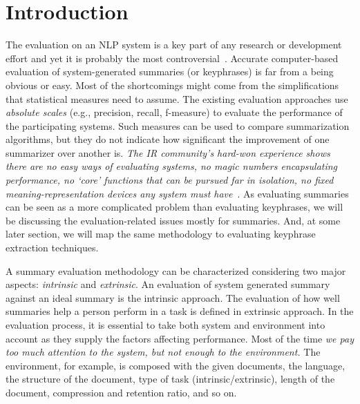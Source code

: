 \documentclass[a4paper]{report}
\begin{document}
\section{Introduction}
The evaluation on an NLP system is a key part of any research or development effort and yet it is probably the most controversial~\cite{Jing98summarizationevaluation}. Accurate computer-based evaluation of system-generated summaries (or keyphrases) is far from a being obvious or easy. Most of the shortcomings might come from the simplifications that statistical measures need to assume. The existing evaluation approaches use \emph{absolute scales} (e.g., precision, recall, f-measure) to evaluate the performance of the participating systems. Such measures can be used to compare summarization algorithms, but they do not indicate how significant the improvement of one summarizer over another is. \emph{The IR community's hard-won experience shows there are no easy ways of evaluating systems, no magic numbers encapsulating performance, no `core' functions that can be pursued far in isolation, no fixed meaning-representation devices any system must have}~\cite{H94-1018}. As evaluating summaries can be seen as a more complicated problem than evaluating keyphrases, we will be discussing the evaluation-related issues mostly for summaries. And, at some later section, we will map the same methodology to evaluating keyphrase extraction techniques. \\

\par A summary evaluation methodology can be characterized considering two major aspects: \emph{intrinsic} and \emph{extrinsic}. An evaluation of system generated summary against an ideal summary is the intrinsic approach. The evaluation of how well summaries help a person perform in a task is defined in extrinsic approach. In the evaluation process, it is essential to take both system and environment into account as they supply the factors affecting performance. Most of the time \emph{we pay too much attention to the system, but not enough to the environment.} The environment, for example, is composed with the given documents, the language, the structure of the document, type of task (intrinsic/extrinsic), length of the document, compression and retention ratio, and so on. \\
\end{document}
